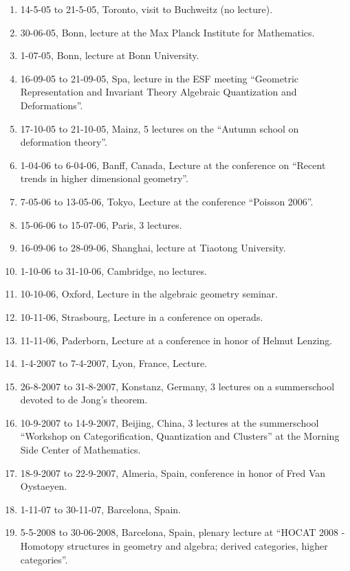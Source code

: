 \documentclass{amsart}
\begin{document}
\begin{enumerate}
\item 14-5-05 to 21-5-05, Toronto, visit to Buchweitz (no lecture).
\item 30-06-05, Bonn, lecture at the Max Planck Institute for Mathematics.
\item 1-07-05, Bonn, lecture at Bonn University.
\item 16-09-05 to 21-09-05, Spa, lecture in the ESF meeting ``Geometric 
Representation and Invariant Theory Algebraic Quantization and Deformations''.
\item 17-10-05 to 21-10-05, Mainz, 5 lectures on the ``Autumn school on
deformation theory''.
\item 1-04-06 to 6-04-06, Banff, Canada, Lecture at the conference
on ``Recent trends in higher dimensional geometry''. 
\item 7-05-06 to 13-05-06, Tokyo, Lecture at the conference ``Poisson 2006''.
\item 15-06-06 to 15-07-06, Paris, 3 lectures.
\item 16-09-06 to 28-09-06, Shanghai, lecture at Tiaotong University. 
\item 1-10-06 to 31-10-06, Cambridge, no lectures.
\item 10-10-06, Oxford, Lecture in the algebraic geometry seminar.  
\item 10-11-06, Strasbourg, Lecture in a conference on operads.
\item 11-11-06, Paderborn, Lecture at a conference in honor of Helmut Lenzing.
\item 1-4-2007 to 7-4-2007, Lyon, France, Lecture.
\item 26-8-2007 to 31-8-2007, Konstanz, Germany, 3 lectures on a summerschool devoted to
  de Jong's theorem.
\item 10-9-2007 to 14-9-2007, Beijing, China, 3 lectures at the summerschool
  ``Workshop on Categorification, Quantization and Clusters'' at the
  Morning Side Center of Mathematics.
\item 18-9-2007 to 22-9-2007, Almeria, Spain, conference in honor of Fred Van
Oystaeyen. 
\item 1-11-07 to 30-11-07, Barcelona, Spain.
\item 5-5-2008 to 30-06-2008, Barcelona, Spain, plenary lecture at 
``HOCAT 2008 - Homotopy structures in geometry and algebra; derived categories,
higher categories''.
\end{enumerate}
\end{document}
